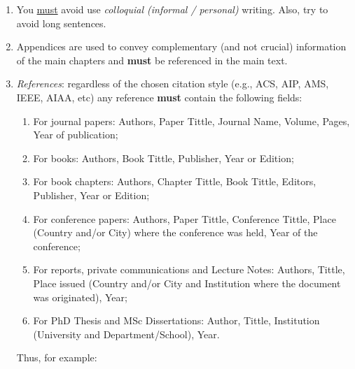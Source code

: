 \documentclass[14pt,twoside]{report}
\begin{document}
\begin{enumerate}
%
\item You \underline{must} avoid use {\it colloquial (informal / personal)} writing. Also, try to avoid long sentences.  
%
\item Appendices are used to convey complementary (and not crucial) information of the main chapters and {\bf must} be referenced in the main text.
%
\item {\it References}: regardless of the chosen citation style (e.g., ACS, AIP, AMS, IEEE, AIAA, etc) any reference {\bf must} contain the following fields: 
\begin{enumerate}
\item For journal papers: Authors, Paper Tittle, Journal Name, Volume, Pages, Year of publication;
\item For books: Authors, Book Tittle, Publisher, Year or Edition;
\item For book chapters: Authors, Chapter Tittle, Book Tittle, Editors, Publisher, Year or Edition;
\item For conference papers: Authors, Paper Tittle, Conference Tittle, Place (Country and/or City) where the conference was held, Year of the conference;
\item For reports,  private communications and Lecture Notes: Authors, Tittle, Place issued (Country and/or City and Institution where the document was originated), Year;
\item For PhD Thesis and MSc Dissertations: Author, Tittle, Institution (University and Department/School), Year.
\end{enumerate}  
Thus, for example:
%
\end{enumerate}
\end{document}
